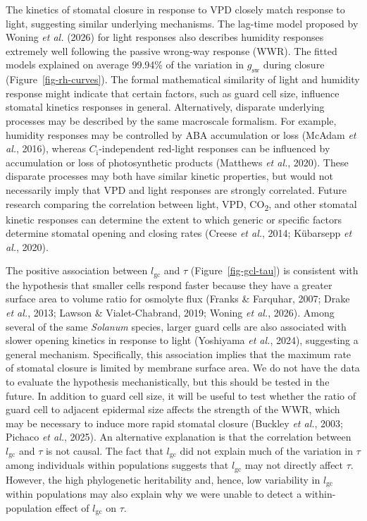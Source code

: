 \documentclass[
  letterpaper,
  DIV=11,
  numbers=noendperiod]{scrartcl}
\newcommand{\gcl}{$l_\mathrm{gc}$}
\newcommand{\gsw}{$g_\mathrm{sw}$}
\begin{document}
The kinetics of stomatal closure in response to VPD closely match
response to light, suggesting similar underlying mechanisms. The
lag-time model proposed by Woning \emph{et al.} (2026) for light
responses also describes humidity responses extremely well following the
passive wrong-way response (WWR). The fitted models explained on average
99.94\% of the variation in \gsw{} during closure
(Figure~\ref{fig-rh-curves}). The formal mathematical similarity of
light and humidity response might indicate that certain factors, such as
guard cell size, influence stomatal kinetics responses in general.
Alternatively, disparate underlying processes may be described by the
same macroscale formalism. For example, humidity responses may be
controlled by ABA accumulation or loss (McAdam \emph{et al.}, 2016),
whereas \(C_\mathrm{i}\)-independent red-light responses can be
influenced by accumulation or loss of photosynthetic products (Matthews
\emph{et al.}, 2020). These disparate processes may both have similar
kinetic properties, but would not necessarily imply that VPD and light
responses are strongly correlated. Future research comparing the
correlation between light, VPD, CO\textsubscript{2}, and other stomatal
kinetic responses can determine the extent to which generic or specific
factors determine stomatal opening and closing rates (Creese \emph{et
al.}, 2014; Kübarsepp \emph{et al.}, 2020).

The positive association between \gcl{} and \(\tau\)
(Figure~\ref{fig-gcl-tau}) is consistent with the hypothesis that
smaller cells respond faster because they have a greater surface area to
volume ratio for osmolyte flux (Franks \& Farquhar, 2007; Drake \emph{et
al.}, 2013; Lawson \& Vialet-Chabrand, 2019; Woning \emph{et al.},
2026). Among several of the same \emph{Solanum} species, larger guard
cells are also associated with slower opening kinetics in response to
light (Yoshiyama \emph{et al.}, 2024), suggesting a general mechanism.
Specifically, this association implies that the maximum rate of stomatal
closure is limited by membrane surface area. We do not have the data to
evaluate the hypothesis mechanistically, but this should be tested in
the future. In addition to guard cell size, it will be useful to test
whether the ratio of guard cell to adjacent epidermal size affects the
strength of the WWR, which may be necessary to induce more rapid
stomatal closure (Buckley \emph{et al.}, 2003; Pichaco \emph{et al.},
2025). An alternative explanation is that the correlation between \gcl{}
and \(\tau\) is not causal. The fact that \gcl{} did not explain much of
the variation in \(\tau\) among individuals within populations suggests
that \gcl{} may not directly affect \(\tau\). However, the high
phylogenetic heritability and, hence, low variability in \gcl{} within
populations may also explain why we were unable to detect a
within-population effect of \gcl{} on \(\tau\).
\end{document}

